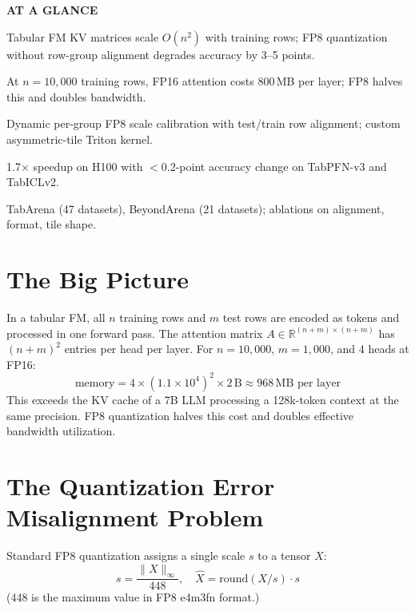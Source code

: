 \documentclass[10pt,twocolumn]{article}
\begin{document}
\begin{mdframed}[backgroundcolor=boxgray,linecolor=rulered,linewidth=1pt,
    innerleftmargin=6pt,innerrightmargin=6pt,
    innertopmargin=6pt,innerbottommargin=6pt]
\textbf{\small AT A GLANCE}\par\vspace{4pt}
\begin{description}[leftmargin=0pt,labelsep=4pt,itemsep=2pt,parsep=0pt,
    font=\small\bfseries]
  \item[Problem:] Tabular FM KV matrices scale $O(n^2)$ with training
    rows; FP8 quantization without row-group alignment degrades
    accuracy by 3--5 points.
  \item[Why it matters:] At $n=10{,}000$ training rows, FP16 attention
    costs 800\,MB per layer; FP8 halves this and doubles bandwidth.
  \item[Method:] Dynamic per-group FP8 scale calibration with test/train
    row alignment; custom asymmetric-tile Triton kernel.
  \item[Result:] 1.7$\times$ speedup on H100 with $<$0.2-point
    accuracy change on TabPFN-v3 and TabICLv2.
  \item[Evidence:] TabArena (47 datasets), BeyondArena (21 datasets);
    ablations on alignment, format, tile shape.
\end{description}
\end{mdframed}

\section{The Big Picture}

In a tabular FM, all $n$ training rows and $m$ test rows are encoded as
tokens and processed in one forward pass. The attention matrix $A \in
\mathbb{R}^{(n+m)\times(n+m)}$ has $(n+m)^2$ entries per head per
layer. For $n = 10{,}000$, $m = 1{,}000$, and 4 heads at FP16:
\[
  \text{memory} = 4\times(1.1\times10^4)^2\times 2\,\text{B}
  \approx 968\,\text{MB per layer}
\]
This exceeds the KV cache of a 7B LLM processing a 128k-token context
at the same precision. FP8 quantization halves this cost and doubles
effective bandwidth utilization.

\section{The Quantization Error Misalignment Problem}

Standard FP8 quantization assigns a single scale $s$ to a tensor $X$:
\[
  s = \frac{\|X\|_\infty}{448}, \quad
  \hat{X} = \mathrm{round}(X/s)\cdot s
\]
(448 is the maximum value in FP8 e4m3fn format.)
\end{document}
